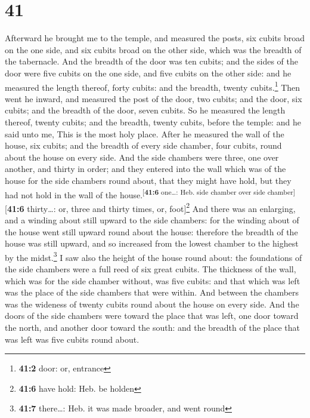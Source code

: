 \hypertarget{section-40}{%
\section{41}\label{section-40}}

 Afterward he brought me to the temple, and measured the
posts, six cubits broad on the one side, and six cubits broad on the
other side, which was the breadth of the tabernacle.  And
the breadth of the door was ten cubits; and the sides of the door were
five cubits on the one side, and five cubits on the other side: and he
measured the length thereof, forty cubits: and the breadth, twenty
cubits.\footnote{\textbf{41:2} door: or, entrance}  Then
went he inward, and measured the post of the door, two cubits; and the
door, six cubits; and the breadth of the door, seven cubits.
 So he measured the length thereof, twenty cubits; and the
breadth, twenty cubits, before the temple: and he said unto me, This is
the most holy place.  After he measured the wall of the
house, six cubits; and the breadth of every side chamber, four cubits,
round about the house on every side.  And the side
chambers were three, one over another, and thirty in order; and they
entered into the wall which was of the house for the side chambers round
about, that they might have hold, but they had not hold in the wall of
the house.\textsuperscript{{[}\textbf{41:6} one\ldots: Heb. side chamber
over side chamber{]}}{[}\textbf{41:6} thirty\ldots: or, three and thirty
times, or, foot{]}\footnote{\textbf{41:6} have hold: Heb. be holden}
 And there was an enlarging, and a winding about still
upward to the side chambers: for the winding about of the house went
still upward round about the house: therefore the breadth of the house
was still upward, and so increased from the lowest chamber to the
highest by the midst.\footnote{\textbf{41:7} there\ldots: Heb. it was
  made broader, and went round}  I saw also the height of
the house round about: the foundations of the side chambers were a full
reed of six great cubits.  The thickness of the wall,
which was for the side chamber without, was five cubits: and that which
was left was the place of the side chambers that were within.
 And between the chambers was the wideness of twenty
cubits round about the house on every side.  And the
doors of the side chambers were toward the place that was left, one door
toward the north, and another door toward the south: and the breadth of
the place that was left was five cubits round about.

